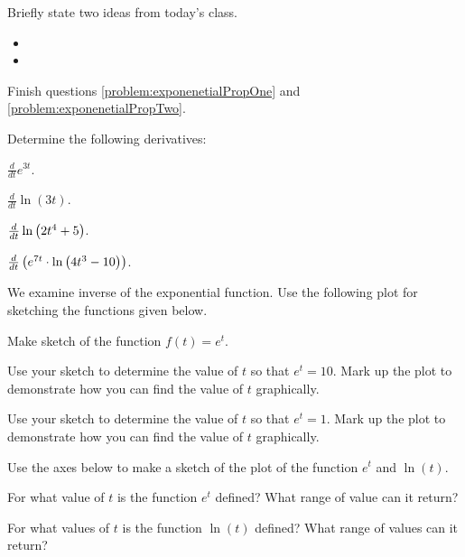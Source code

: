 \begin{problem}
\item Briefly state two ideas from today's class.
  \begin{itemize}
  \item
  \item
  \end{itemize}
\item Finish questions \ref{problem:exponenetialPropOne} and \ref{problem:exponenetialPropTwo}.
\item Determine the following derivatives:
  \begin{subproblem}
    \item $\frac{d}{dt} e^{3t}$.
      \vfill
    \item $\frac{d}{dt} \ln(3t)$.
      \vfill
    \item $\frac{d}{dt} \ln\left( 2t^4 + 5\right)$.
      \vfill
    \item $\frac{d}{dt} \left( e^{7t} \cdot \ln \left( 4t^3 - 10\right) \right)$.
      \vfill
  \end{subproblem}

\clearpage

\item We examine inverse of the exponential function. Use the
  following plot for sketching the functions given below.

  \scalebox{0.75}{}

  \begin{subproblem}
  \item Make sketch of the function $f(t) = e^t$.
  \item Use your sketch to determine the value of $t$ so that
    $e^t=10$. Mark up the plot to demonstrate how you can find the
    value of $t$ graphically.
  \item Use your sketch to determine the value of $t$ so that
    $e^t=1$. Mark up the plot to demonstrate how you can find the
    value of $t$ graphically.
  \end{subproblem}

\item Use the axes below to make a sketch of the plot of the function
  $e^t$ and $\ln(t)$.

  \scalebox{0.75}{}


\item For what value of $t$ is the function $e^t$ defined? What range
  of value can it return?

\item For what values of $t$ is the function $\ln(t)$ defined? What
  range of values can it return?



\end{problem}

